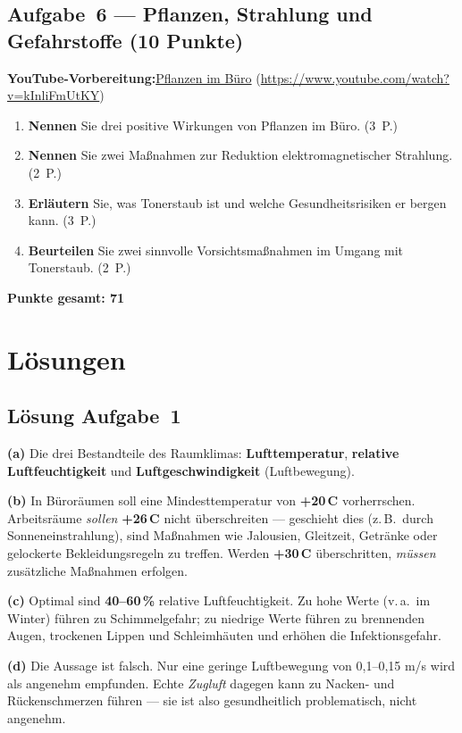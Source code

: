 \documentclass[11pt, a4paper]{article}
\begin{document}
\subsection*{Aufgabe~6 --- Pflanzen, Strahlung und Gefahrstoffe (10 Punkte)}

\noindent\textbf{\color{bfwAccent}YouTube-Vorbereitung:}\enspace \href{https://www.youtube.com/watch?v=kInliFmUtKY}{Pflanzen im Büro} (\url{https://www.youtube.com/watch?v=kInliFmUtKY})

\medskip
\begin{enumerate}[label=(\alph*)]
  \item \textbf{Nennen} Sie drei positive Wirkungen von Pflanzen im Büro. \hfill (3~P.)
  \item \textbf{Nennen} Sie zwei Maßnahmen zur Reduktion elektromagnetischer Strahlung. \hfill (2~P.)
  \item \textbf{Erläutern} Sie, was Tonerstaub ist und welche Gesundheitsrisiken er bergen kann. \hfill (3~P.)
  \item \textbf{Beurteilen} Sie zwei sinnvolle Vorsichtsmaßnahmen im Umgang mit Tonerstaub. \hfill (2~P.)
\end{enumerate}

\vspace{1em}
\noindent\textbf{Punkte gesamt: 71}

\newpage

\section{Lösungen}\label{loesungen}

\subsection*{Lösung Aufgabe~1}
\begin{loesung}
\textbf{(a)} Die drei Bestandteile des Raumklimas: \textbf{Lufttemperatur}, \textbf{relative
Luftfeuchtigkeit} und \textbf{Luftgeschwindigkeit} (Luftbewegung).

\textbf{(b)} In Büroräumen soll eine Mindesttemperatur von \textbf{+20\,\textdegree C}
vorherrschen. Arbeitsräume \emph{sollen} \textbf{+26\,\textdegree C} nicht überschreiten ---
geschieht dies (z.\,B.\ durch Sonneneinstrahlung), sind Maßnahmen wie Jalousien, Gleitzeit,
Getränke oder gelockerte Bekleidungsregeln zu treffen. Werden \textbf{+30\,\textdegree C}
überschritten, \emph{müssen} zusätzliche Maßnahmen erfolgen.

\textbf{(c)} Optimal sind \textbf{40--60\,\%} relative Luftfeuchtigkeit. Zu hohe Werte
(v.\,a.\ im Winter) führen zu Schimmelgefahr; zu niedrige Werte führen zu brennenden Augen,
trockenen Lippen und Schleimhäuten und erhöhen die Infektionsgefahr.

\textbf{(d)} Die Aussage ist falsch. Nur eine geringe Luftbewegung von 0,1--0,15 m/s wird
als angenehm empfunden. Echte \emph{Zugluft} dagegen kann zu Nacken- und Rückenschmerzen
führen --- sie ist also gesundheitlich problematisch, nicht angenehm.
\end{loesung}
\end{document}
